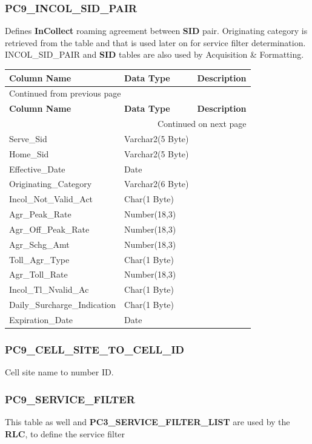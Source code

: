 \documentclass[12pt,twoside]{article}
\begin{document}
\subsubsection{PC9\_INCOL\_SID\_PAIR}
\label{sec:orgheadline57}
Defines \textbf{InCollect} roaming agreement between \textbf{SID} pair.
Originating category is retrieved from the table and that is used
later on for service filter determination. INCOL\_SID\_PAIR
and \textbf{SID} tables are also used by Acquisition \& Formatting.
\footnotesize

\begin{longtable}{l|l|l}
\hline
\textbf{Column Name} & \textbf{Data Type} & \textbf{Description}\\
\hline
\endfirsthead
\multicolumn{3}{l}{Continued from previous page} \\
\hline

\textbf{Column Name} & \textbf{Data Type} & \textbf{Description} \\

\hline
\endhead
\hline\multicolumn{3}{r}{Continued on next page} \\
\endfoot
\endlastfoot
\hline
Serve\_Sid & Varchar2(5 Byte) & \\
Home\_Sid & Varchar2(5 Byte) & \\
Effective\_Date & Date & \\
Originating\_Category & Varchar2(6 Byte) & \\
Incol\_Not\_Valid\_Act & Char(1 Byte) & \\
Agr\_Peak\_Rate & Number(18,3) & \\
Agr\_Off\_Peak\_Rate & Number(18,3) & \\
Agr\_Schg\_Amt & Number(18,3) & \\
Toll\_Agr\_Type & Char(1 Byte) & \\
Agr\_Toll\_Rate & Number(18,3) & \\
Incol\_Tl\_Nvalid\_Ac & Char(1 Byte) & \\
Daily\_Surcharge\_Indication & Char(1 Byte) & \\
Expiration\_Date & Date & \\
\hline
\end{longtable}
\normalsize

\subsubsection{PC9\_CELL\_SITE\_TO\_CELL\_ID}
\label{sec:orgheadline58}
Cell site name to number ID.

\subsubsection{PC9\_SERVICE\_FILTER}
\label{sec:orgheadline59}
This table as well and \textbf{PC3\_SERVICE\_FILTER\_LIST} are used by the \textbf{RLC}, to define the service filter 
\footnotesize
\end{document}
